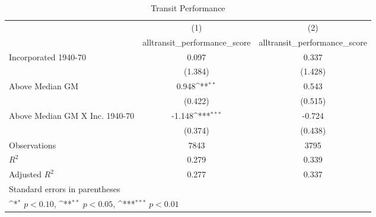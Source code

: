 \begin{table}[htbp]\centering
\def\sym#1{\ifmmode^{#1}\else\(^{#1}\)\fi}
\caption{Transit Performance}
\begin{tabular}{l*{2}{c}}
\hline\hline
                    &\multicolumn{1}{c}{(1)}&\multicolumn{1}{c}{(2)}\\
                    &\multicolumn{1}{c}{alltransit\_performance\_score}&\multicolumn{1}{c}{alltransit\_performance\_score}\\
\hline
Incorporated 1940-70&       0.097         &       0.337         \\
                    &     (1.384)         &     (1.428)         \\
[1em]
Above Median GM     &       0.948\sym{**} &       0.543         \\
                    &     (0.422)         &     (0.515)         \\
[1em]
Above Median GM X Inc. 1940-70&      -1.148\sym{***}&      -0.724         \\
                    &     (0.374)         &     (0.438)         \\
\hline
Observations        &        7843         &        3795         \\
\(R^{2}\)           &       0.279         &       0.339         \\
Adjusted \(R^{2}\)  &       0.277         &       0.337         \\
\hline\hline
\multicolumn{3}{l}{\footnotesize Standard errors in parentheses}\\
\multicolumn{3}{l}{\footnotesize \sym{*} \(p<0.10\), \sym{**} \(p<0.05\), \sym{***} \(p<0.01\)}\\
\end{tabular}
\end{table}
